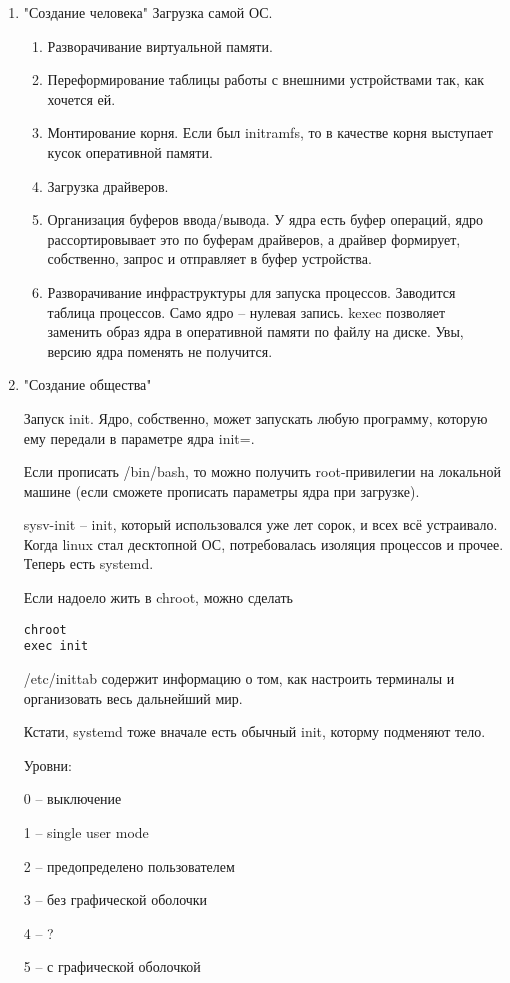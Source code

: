 \documentclass[a4paper,10pt]{article}
\begin{document}
\begin{enumerate}
\item "Создание человека"
Загрузка самой ОС.
\begin{enumerate}
\item Разворачивание виртуальной памяти.
\item Переформирование таблицы работы с внешними устройствами так, как хочется ей. 
\item Монтирование корня. Если был initramfs, то в качестве корня выступает кусок оперативной памяти.
\item Загрузка драйверов.
\item Организация буферов ввода/вывода. У ядра есть буфер операций, ядро рассортировывает это по буферам драйверов, а драйвер формирует, собственно, запрос и отправляет в буфер устройства.
\item Разворачивание инфраструктуры для запуска процессов. Заводится таблица процессов. Само ядро -- нулевая запись.
kexec позволяет заменить образ ядра в оперативной памяти по файлу на диске. Увы, версию ядра поменять не получится.
\end{enumerate}
\item "Создание общества"

Запуск init. Ядро, собственно, может запускать любую программу, которую ему передали в параметре ядра init=.

Если прописать /bin/bash, то можно получить root-привилегии на локальной машине (если сможете прописать параметры ядра при загрузке).

sysv-init -- init, который использовался уже лет сорок, и всех всё устраивало. Когда linux стал десктопной ОС, потребовалась изоляция процессов и прочее. Теперь есть systemd.

Если надоело жить в chroot, можно сделать 
\begin{verbatim}
chroot
exec init 
\end{verbatim}
/etc/inittab содержит информацию о том, как настроить терминалы и организовать весь дальнейший мир.

Кстати, systemd тоже вначале есть обычный init, которму подменяют тело.

Уровни:

0 -- выключение

1 -- single user mode

2 -- предопределено пользователем

3 -- без графической оболочки

4 -- ?

5 -- с графической оболочкой


\end{enumerate}
\end{document}

